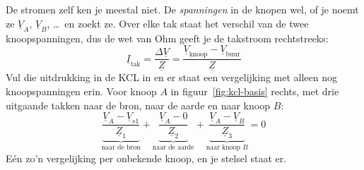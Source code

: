 \documentclass[a4paper,11pt]{article}
\begin{document}
De stromen zelf ken je meestal niet. De \emph{spanningen} in de knopen wel, of je noemt ze
$\underline{V}_A$, $\underline{V}_B$, \dots\ en zoekt ze. Over elke tak staat het verschil van de
twee knoopspanningen, dus de wet van Ohm geeft je de takstroom rechtstreeks:
\[\underline{I}_{\text{tak}} = \frac{\Delta \underline{V}}{\underline{Z}}
    = \frac{\underline{V}_{\text{knoop}} - \underline{V}_{\text{buur}}}{\underline{Z}}\]
Vul die uitdrukking in de KCL in en er staat een vergelijking met alleen nog knoopspanningen erin.
Voor knoop $A$ in figuur~\ref{fig:kcl-basis} rechts, met drie uitgaande takken naar de bron, naar
de aarde en naar knoop $B$:
\[\underbrace{\frac{\underline{V}_A - \underline{V}_{s1}}{\underline{Z}_1}}_{\text{naar de bron}}
    + \underbrace{\frac{\underline{V}_A - 0}{\underline{Z}_2}}_{\text{naar de aarde}}
    + \underbrace{\frac{\underline{V}_A - \underline{V}_B}{\underline{Z}_3}}_{\text{naar knoop }B} = 0\]
Eén zo'n vergelijking per onbekende knoop, en je stelsel staat er.
\end{document}
